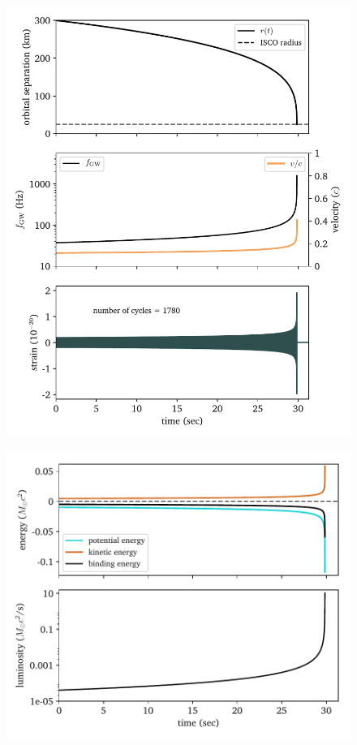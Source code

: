 \documentclass[11pt]{article}
\begin{document}
\begin{enumerate}
\begin{figure}[!h]
\centering
\includegraphics[scale=1]{inspiral/inspiral_orbit_parameters.pdf}
\caption{\label{fig:orbit_parameters}}
\end{figure}

\begin{figure}[!h]
\centering
\includegraphics[scale=1]{inspiral/inspiral_energies.pdf}
\caption{\label{fig:inspiral_energy}}
\end{figure}


\end{enumerate}
\end{document}
